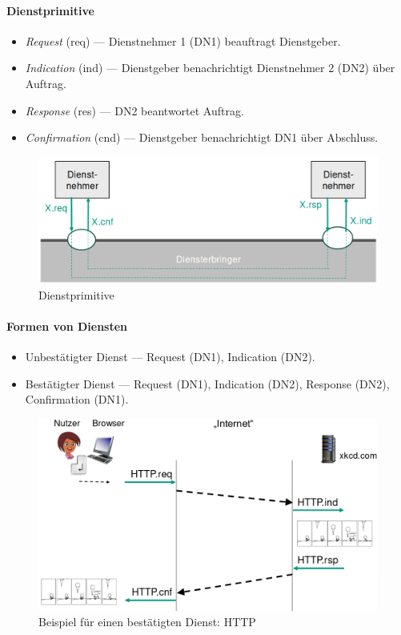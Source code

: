 \documentclass[a4paper, 14pt]{article}
\begin{document}
	\paragraph{Dienstprimitive}

	\begin{itemize}
		\item \emph{Request} (req) --- Dienstnehmer 1 (DN1) beauftragt Dienstgeber.
		\item \emph{Indication} (ind) --- Dienstgeber benachrichtigt Dienstnehmer 2 (DN2) über Auftrag.
		\item \emph{Response} (res) --- DN2 beantwortet Auftrag.
		\item \emph{Confirmation} (cnd) --- Dienstgeber benachrichtigt DN1 über Abschluss.
	\end{itemize}

	\begin{figure}
		\includegraphics[width=\textwidth]{images/02-primitives.png}
		\caption{Dienstprimitive}
	\end{figure}

	\paragraph{Formen von Diensten}

	\begin{itemize}
		\item Unbestätigter Dienst --- Request (DN1), Indication (DN2).
		\item Bestätigter Dienst --- Request (DN1), Indication (DN2), Response (DN2), Confirmation (DN1).
	\end{itemize}

	\begin{figure}
		\includegraphics[width=\textwidth]{images/02-http-example.png}
		\caption{Beispiel für einen bestätigten Dienst: HTTP}
	\end{figure}
\end{document}
